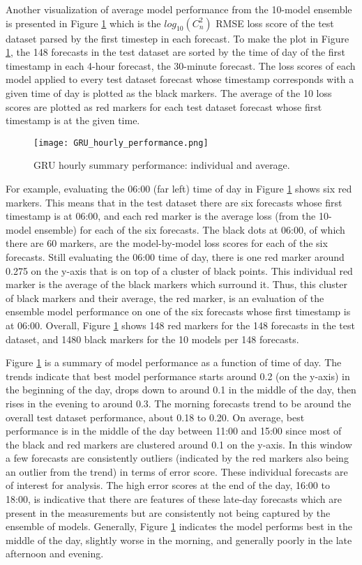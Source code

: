 Another visualization of average model performance from the 10-model ensemble is presented in Figure \ref{fig:GRU_hourly_performance} which is the $log_{10}(C_{n}^{2})$ RMSE loss score of the test dataset parsed by the first timestep in each forecast. To make the plot in Figure \ref{fig:GRU_hourly_performance}, the 148 forecasts in the test dataset are sorted by the time of day of the first timestamp in each 4-hour forecast, the 30-minute forecast. The loss scores of each model applied to every test dataset forecast whose timestamp corresponds with a given time of day is plotted as the black markers. The average of the 10 loss scores are plotted as red markers for each test dataset forecast whose first timestamp is at the given time.
\begin{figure}[h!]
	\centering
	\texttt{[image: GRU\_hourly\_performance.png]}
	\caption{GRU hourly summary performance: individual and average.}
	\label{fig:GRU_hourly_performance}
\end{figure}
For example, evaluating the 06:00 (far left) time of day in Figure \ref{fig:GRU_hourly_performance} shows six red markers. This means that in the test dataset there are six forecasts whose first timestamp is at 06:00, and each red marker is the average loss (from the 10-model ensemble) for each of the six forecasts. The black dots at 06:00, of which there are 60 markers, are the model-by-model loss scores for each of the six forecasts. Still evaluating the 06:00 time of day, there is one red marker around 0.275 on the y-axis that is on top of a cluster of black points. This individual red marker is the average of the black markers which surround it. Thus, this cluster of black markers and their average, the red marker, is an evaluation of the ensemble model performance on one of the six forecasts whose first timestamp is at 06:00. Overall, Figure \ref{fig:GRU_hourly_performance} shows 148 red markers for the 148 forecasts in the test dataset, and 1480 black markers for the 10 models per 148 forecasts.

Figure \ref{fig:GRU_hourly_performance} is a summary of model performance as a function of time of day. The trends indicate that best model performance starts around 0.2 (on the y-axis) in the beginning of the day, drops down to around 0.1 in the middle of the day, then rises in the evening to around 0.3. The morning forecasts trend to be around the overall test dataset performance, about 0.18 to 0.20. On average, best performance is in the middle of the day between 11:00 and 15:00 since most of the black and red markers are clustered around 0.1 on the y-axis. In this window a few forecasts are consistently outliers (indicated by the red markers also being an outlier from the trend) in terms of error score. These individual forecasts are of interest for analysis. The high error scores at the end of the day, 16:00 to 18:00, is indicative that there are features of these late-day forecasts which are present in the measurements but are consistently not being captured by the ensemble of models. Generally, Figure \ref{fig:GRU_hourly_performance} indicates the model performs best in the middle of the day, slightly worse in the morning, and generally poorly in the late afternoon and evening.

